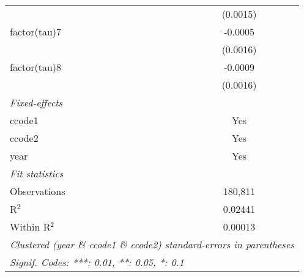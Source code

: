 \begin{tabular}{lc}
                       & (0.0015)\\   
   factor(tau)7        & -0.0005\\   
                       & (0.0016)\\   
   factor(tau)8        & -0.0009\\   
                       & (0.0016)\\   
   \midrule
   \emph{Fixed-effects}\\
   ccode1              & Yes\\  
   ccode2              & Yes\\  
   year                & Yes\\  
   \midrule
   \emph{Fit statistics}\\
   Observations        & 180,811\\  
   R$^2$               & 0.02441\\  
   Within R$^2$        & 0.00013\\  
   \midrule \midrule
   \multicolumn{2}{l}{\emph{Clustered (year \& ccode1 \& ccode2) standard-errors in parentheses}}\\
   \multicolumn{2}{l}{\emph{Signif. Codes: ***: 0.01, **: 0.05, *: 0.1}}\\
\end{tabular}
\par\endgroup


